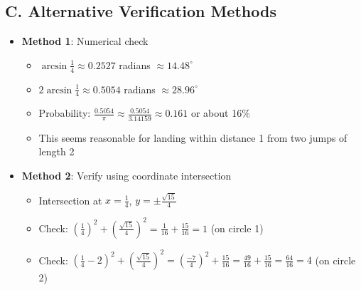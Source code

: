 \documentclass[12pt]{article}
\begin{document}
\begin{verificationbox}
\subsection*{C. Alternative Verification Methods}
\begin{itemize}[leftmargin=*]
    \item \textbf{Method 1}: Numerical check
    \begin{itemize}
        \item $\arcsin\frac{1}{4} \approx 0.2527$ radians $\approx 14.48^\circ$
        \item $2\arcsin\frac{1}{4} \approx 0.5054$ radians $\approx 28.96^\circ$
        \item Probability: $\frac{0.5054}{\pi} \approx \frac{0.5054}{3.14159} \approx 0.161$ or about 16\%
        \item This seems reasonable for landing within distance 1 from two jumps of length 2
    \end{itemize}
    \item \textbf{Method 2}: Verify using coordinate intersection
    \begin{itemize}
        \item Intersection at $x = \frac{1}{4}$, $y = \pm\frac{\sqrt{15}}{4}$
        \item Check: $\left(\frac{1}{4}\right)^2 + \left(\frac{\sqrt{15}}{4}\right)^2 = \frac{1}{16} + \frac{15}{16} = 1$ \checkmark (on circle 1)
        \item Check: $\left(\frac{1}{4} - 2\right)^2 + \left(\frac{\sqrt{15}}{4}\right)^2 = \left(\frac{-7}{4}\right)^2 + \frac{15}{16} = \frac{49}{16} + \frac{15}{16} = \frac{64}{16} = 4$ \checkmark (on circle 2)
    \end{itemize}
\end{itemize}
\end{verificationbox}
\end{document}
